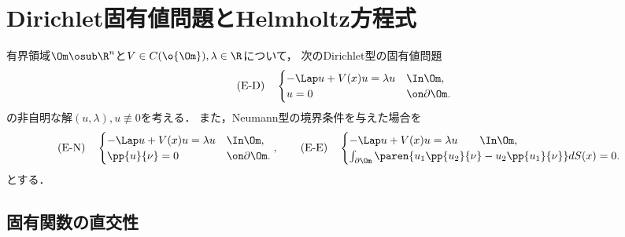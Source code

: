\documentclass[uplatex,dvipdfmx]{jsreport}
\begin{document}
\section{Dirichlet固有値問題とHelmholtz方程式}

\begin{problem}
    有界領域$\Om\osub\R^n$と$V\in C(\o{\Om}),\lambda\in\R$について，
    次のDirichlet型の固有値問題
    \[\text{(E-D)}\quad\begin{cases}
        -\Lap u+V(x)u=\lambda u&\In\Om,\\
        u=0&\on\partial\Om.
    \end{cases}\]
    の非自明な解$(u,\lambda),u\not\equiv0$を考える．
    また，Neumann型の境界条件を与えた場合を
    \[\text{(E-N)}\quad\begin{cases}
        -\Lap u+V(x)u=\lambda u&\In\Om,\\
        \pp{u}{\nu}=0&\on\partial\Om.
    \end{cases},\qquad\text{(E-E)}\quad\begin{cases}
        -\Lap u+V(x)u=\lambda u\qquad\In\Om,\\
        \int_{\partial\Om}\paren{u_1\pp{u_2}{\nu}-u_2\pp{u_1}{\nu}}dS(x)=0.
    \end{cases}\]
    とする．
\end{problem}

\subsection{固有関数の直交性}
\end{document}

